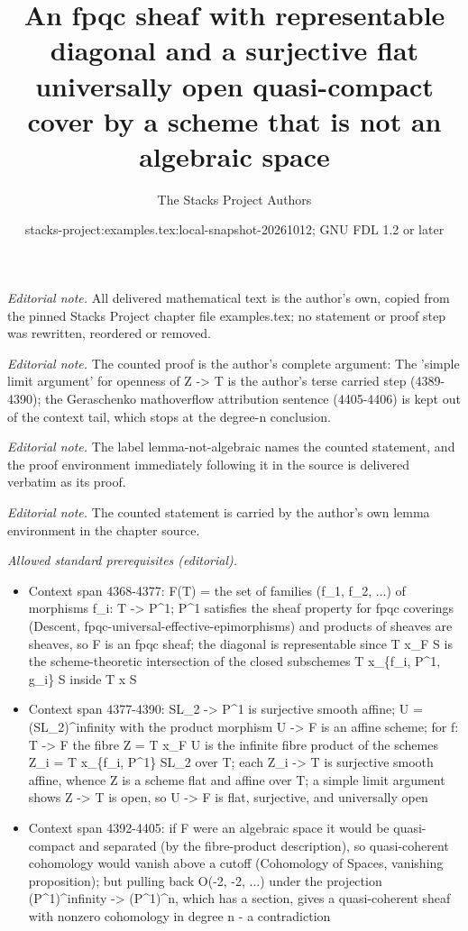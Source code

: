 \documentclass[10pt,a4paper]{amsart}
\title{An fpqc sheaf with representable diagonal and a surjective flat universally open quasi-compact cover by a scheme that is not an algebraic space}
\author{The Stacks Project Authors}
\date{stacks-project:examples.tex:local-snapshot-20261012; GNU FDL 1.2 or later}
\theoremstyle{plain}
\theoremstyle{definition}
\theoremstyle{remark}
\numberwithin{equation}{subsection}
\begin{document}
\maketitle
\noindent\textit{Editorial note.} All delivered mathematical text is the author's own, copied from the pinned Stacks Project chapter file examples.tex; no statement or proof step was rewritten, reordered or removed.\par\medskip
\noindent\textit{Editorial note.} The counted proof is the author's complete argument: The 'simple limit argument' for openness of Z -> T is the author's terse carried step (4389-4390); the Geraschenko mathoverflow attribution sentence (4405-4406) is kept out of the context tail, which stops at the degree-n conclusion.\par\medskip
\noindent\textit{Editorial note.} The label lemma-not-algebraic names the counted statement, and the proof environment immediately following it in the source is delivered verbatim as its proof.\par\medskip
\noindent\textit{Editorial note.} The counted statement is carried by the author's own lemma environment in the chapter source.\par\medskip
\noindent\textit{Allowed standard prerequisites (editorial).}\begin{itemize}
\item Context span 4368-4377: F(T) = the set of families (f\_1, f\_2, ...) of morphisms f\_i: T -> P\textasciicircum{}1; P\textasciicircum{}1 satisfies the sheaf property for fpqc coverings (Descent, fpqc-universal-effective-epimorphisms) and products of sheaves are sheaves, so F is an fpqc sheaf; the diagonal is representable since T x\_F S is the scheme-theoretic intersection of the closed subschemes T x\_\{f\_i, P\textasciicircum{}1, g\_i\} S inside T x S
\item Context span 4377-4390: SL\_2 -> P\textasciicircum{}1 is surjective smooth affine; U = (SL\_2)\textasciicircum{}infinity with the product morphism U -> F is an affine scheme; for f: T -> F the fibre Z = T x\_F U is the infinite fibre product of the schemes Z\_i = T x\_\{f\_i, P\textasciicircum{}1\} SL\_2 over T; each Z\_i -> T is surjective smooth affine, whence Z is a scheme flat and affine over T; a simple limit argument shows Z -> T is open, so U -> F is flat, surjective, and universally open
\item Context span 4392-4405: if F were an algebraic space it would be quasi-compact and separated (by the fibre-product description), so quasi-coherent cohomology would vanish above a cutoff (Cohomology of Spaces, vanishing proposition); but pulling back O(-2, -2, ...) under the projection (P\textasciicircum{}1)\textasciicircum{}infinity -> (P\textasciicircum{}1)\textasciicircum{}n, which has a section, gives a quasi-coherent sheaf with nonzero cohomology in degree n - a contradiction
\end{itemize}\medskip
\end{document}
